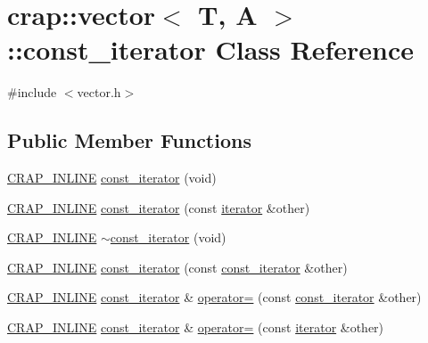 \hypertarget{classcrap_1_1vector_1_1const__iterator}{\section{crap\+:\+:vector$<$ T, A $>$\+:\+:const\+\_\+iterator Class Reference}
\label{classcrap_1_1vector_1_1const__iterator}
}


{\ttfamily \#include $<$vector.\+h$>$}

\subsection*{Public Member Functions}
\begin{DoxyCompactItemize}
\item 
\hyperlink{config__x86_8h_a5a40526b8d842e7ff731509998bb0f1c}{C\+R\+A\+P\+\_\+\+I\+N\+L\+I\+N\+E} \hyperlink{classcrap_1_1vector_1_1const__iterator_a7336b008ee18e114b79ddd848acbcdd7}{const\+\_\+iterator} (void)
\item 
\hyperlink{config__x86_8h_a5a40526b8d842e7ff731509998bb0f1c}{C\+R\+A\+P\+\_\+\+I\+N\+L\+I\+N\+E} \hyperlink{classcrap_1_1vector_1_1const__iterator_a8a7d1fbee226547394135cc69b7d3273}{const\+\_\+iterator} (const \hyperlink{classcrap_1_1vector_1_1iterator}{iterator} \&other)
\item 
\hyperlink{config__x86_8h_a5a40526b8d842e7ff731509998bb0f1c}{C\+R\+A\+P\+\_\+\+I\+N\+L\+I\+N\+E} \hyperlink{classcrap_1_1vector_1_1const__iterator_a4e3d1a2cddd54e0968650c79e80177e1}{$\sim$const\+\_\+iterator} (void)
\item 
\hyperlink{config__x86_8h_a5a40526b8d842e7ff731509998bb0f1c}{C\+R\+A\+P\+\_\+\+I\+N\+L\+I\+N\+E} \hyperlink{classcrap_1_1vector_1_1const__iterator_afd2954e6b313544f87287100b15c8463}{const\+\_\+iterator} (const \hyperlink{classcrap_1_1vector_1_1const__iterator}{const\+\_\+iterator} \&other)
\item 
\hyperlink{config__x86_8h_a5a40526b8d842e7ff731509998bb0f1c}{C\+R\+A\+P\+\_\+\+I\+N\+L\+I\+N\+E} \hyperlink{classcrap_1_1vector_1_1const__iterator}{const\+\_\+iterator} \& \hyperlink{classcrap_1_1vector_1_1const__iterator_ab78ff87c98ece57950360310884f2ca3}{operator=} (const \hyperlink{classcrap_1_1vector_1_1const__iterator}{const\+\_\+iterator} \&other)
\item 
\hyperlink{config__x86_8h_a5a40526b8d842e7ff731509998bb0f1c}{C\+R\+A\+P\+\_\+\+I\+N\+L\+I\+N\+E} \hyperlink{classcrap_1_1vector_1_1const__iterator}{const\+\_\+iterator} \& \hyperlink{classcrap_1_1vector_1_1const__iterator_a6149aa2a9da4bc7475c967c40f989e8c}{operator=} (const \hyperlink{classcrap_1_1vector_1_1iterator}{iterator} \&other)

\end{DoxyCompactItemize}
